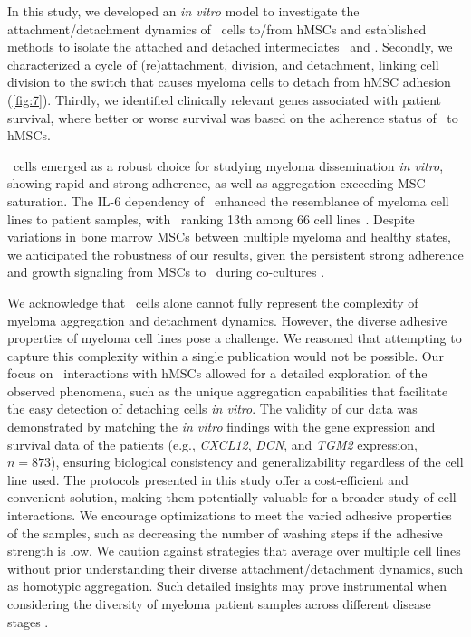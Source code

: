 \newpage


%
\label{C1:discussion}%
In this study, we developed an \textit{in vitro} model to investigate the
attachment/detachment dynamics of \INA\ cells to/from hMSCs and established
methods to isolate the attached and detached intermediates \nMAina\ and \MAina.
Secondly, we characterized a cycle of (re)attachment, division, and detachment,
linking cell division to the switch that causes myeloma cells to detach from
hMSC adhesion (\autoref{fig:7}). Thirdly, we identified clinically relevant
genes associated with patient survival, where better or worse survival was based
on the adherence status of \INA\ to hMSCs.

\INA\ cells emerged as a robust choice for studying myeloma dissemination
\textit{in vitro}, showing rapid and strong adherence, as well as aggregation
exceeding MSC saturation. The IL-6 dependency of \INA\ enhanced the resemblance
of myeloma cell lines to patient samples, with \INA\ ranking 13th among 66 cell
lines \cite{sarinEvaluatingEfficacyMultiple2020}. Despite variations in bone
marrow MSCs between multiple myeloma and healthy states, we anticipated the
robustness of our results, given the persistent strong adherence and growth
signaling from MSCs to \INA\ during co-cultures
\cite{dotterweichContactMyelomaCells2016}.


We acknowledge that \INA\ cells alone cannot fully represent the complexity of
myeloma aggregation and detachment dynamics. However, the diverse adhesive
properties of myeloma cell lines pose a challenge. We reasoned that attempting
to capture this complexity within a single publication would not be possible.
Our focus on \INA\ interactions with hMSCs allowed for a detailed exploration of
the observed phenomena, such as the unique aggregation capabilities that
facilitate the easy detection of detaching cells \textit{in vitro}. The validity
of our data was demonstrated by matching the \textit{in vitro} findings with the
gene expression and survival data of the patients (e.g., \textit{CXCL12},
\textit{DCN}, and \textit{TGM2} expression, \( n=873 \)), ensuring biological
consistency and generalizability regardless of the cell line used. The protocols
presented in this study offer a cost-efficient and convenient solution, making
them potentially valuable for a broader study of cell interactions. We encourage
optimizations to meet the varied adhesive properties of the samples, such as
decreasing the number of washing steps if the adhesive strength is low. We
caution against strategies that average over multiple cell lines without prior
understanding their diverse attachment/detachment dynamics, such as homotypic
aggregation. Such detailed insights may prove instrumental when considering the
diversity of myeloma patient samples across different disease stages
\cite{kawanoHomotypicCellAggregations1991a, okunoVitroGrowthPattern1991}.

